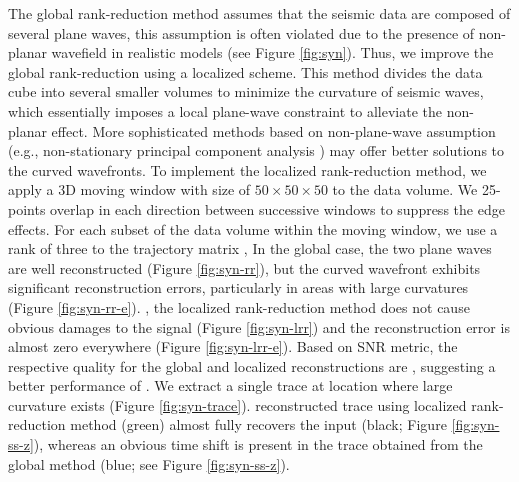 The global rank-reduction method assumes that the seismic data are composed of several plane waves,  this assumption is often violated due to the presence of  non-planar wavefield in realistic models (see Figure \ref{fig:syn}). Thus, we improve the global rank-reduction  using a localized scheme. This method divides the data cube into several smaller volumes to minimize the curvature of seismic waves, which essentially imposes a local plane-wave constraint to alleviate the non-planar effect.  More sophisticated methods based on non-plane-wave assumption (e.g.,  non-stationary principal component analysis \cite{zhao2016principal}) may offer better solutions to the curved wavefronts. To implement the localized rank-reduction method, we apply a 3D moving window with  size of $50\times 50\times 50$ to the data volume. We   25-points  overlap in each direction between successive windows to suppress the edge effects. For each subset of the data volume within the moving window, we use a  rank of three to  the trajectory matrix ,   In the global case, the two plane waves are well reconstructed (Figure \ref{fig:syn-rr}), but the curved wavefront exhibits significant reconstruction errors, particularly in areas with large curvatures (Figure \ref{fig:syn-rr-e}). , the localized rank-reduction method does not cause obvious damages to the signal (Figure \ref{fig:syn-lrr}) and the reconstruction error is almost zero everywhere (Figure \ref{fig:syn-lrr-e}). Based on SNR metric, the respective quality  for the global and localized reconstructions are , suggesting a better performance of . We extract a single trace at  location where large curvature exists (Figure \ref{fig:syn-trace}).  reconstructed trace using localized rank-reduction method (green) almost fully recovers the input (black; Figure \ref{fig:syn-ss-z}), whereas an obvious time shift is present in the trace obtained from the global method (blue; see Figure \ref{fig:syn-ss-z}).

